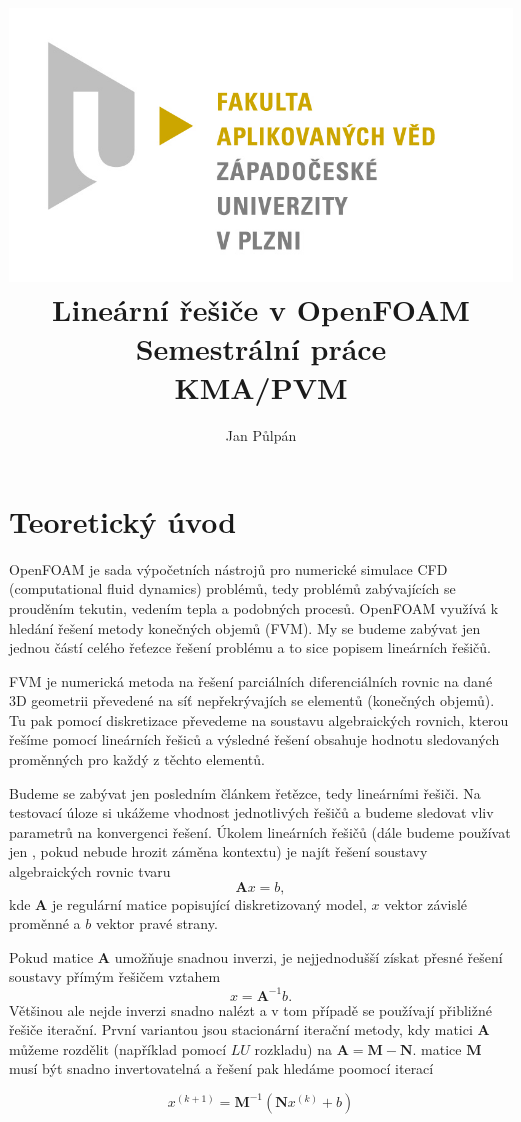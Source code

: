 \documentclass[a4paper,12pt]{report}
\title{
	{\includegraphics[width=\linewidth]{FAV_logo.jpg}}\\[2cm]
	{Lineární řešiče v OpenFOAM}\\	
	{\small{Semestrální práce}}\\
	{\small{KMA/PVM}}\\
}
\author{Jan Půlpán}
\theoremstyle{remark}
\begin{document}
	\maketitle

	{\let\clearpage\relax \chapter{Teoretický úvod}}



	
	OpenFOAM je sada výpočetních nástrojů pro numerické simulace CFD (computational fluid dynamics) problémů, tedy problémů zabývajících se prouděním tekutin, vedením tepla a podobných procesů. OpenFOAM využívá k hledání řešení metody konečných objemů (FVM). My se budeme zabývat jen jednou částí celého řeťezce řešení problému a to sice popisem lineárních řešičů.
	
	FVM je numerická metoda na řešení parciálních diferenciálních rovnic na dané 3D geometrii převedené na síť nepřekrývajích se elementů (konečných objemů). Tu pak pomocí diskretizace převedeme na soustavu algebraických rovnich, kterou řešíme pomocí lineárních řešiců a výsledné řešení obsahuje hodnotu sledovaných proměnných pro každý z těchto elementů.
	
	Budeme se zabývat jen posledním článkem řetězce, tedy lineárními řešiči. Na testovací úloze si ukážeme vhodnost jednotlivých řešičů a budeme sledovat vliv parametrů na konvergenci řešení. Úkolem lineárních řešičů (dále budeme používat jen , pokud nebude hrozit záměna kontextu) je najít řešení soustavy algebraických rovnic tvaru
	\begin{equation}
		\boldsymbol{A}x = b,
		\label{eq:linear_set}
	\end{equation}
	kde $\boldsymbol{A}$ je regulární matice popisující diskretizovaný model, $x$ vektor závislé proměnné a $b$ vektor pravé strany. 
	
	Pokud matice $\boldsymbol{A}$ umožňuje snadnou inverzi, je nejjednodušší získat přesné řešení soustavy přímým řešičem vztahem 
	$$ x = \boldsymbol{A}^{-1} b.$$ 
	Většinou ale nejde inverzi snadno nalézt a v tom případě se používají přibližné řešiče iterační. První variantou jsou stacionární iterační metody, kdy matici $\boldsymbol{A}$ můžeme rozdělit (například pomocí $LU$ rozkladu) na $\boldsymbol{A} = \boldsymbol{M} - \boldsymbol{N}$. matice $\pmb{M}$ musí být snadno invertovatelná a řešení pak hledáme poomocí iterací 
	
	\begin{equation}
		x^{(k+1)} = \boldsymbol{M}^{-1}(\boldsymbol{N}x^{(k)} + b)
		\label{eq:stat_iter}
	\end{equation}
\end{document}
